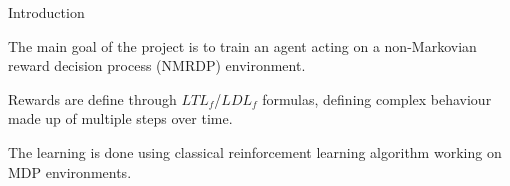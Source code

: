 \begin{frame}{Introduction}
	\begin{block}{}
    The main goal of the project is to train an agent acting on a non-Markovian reward decision process (NMRDP) environment.
	\end{block}

    \begin{block}{}
    Rewards are define through $LTL_f$/$LDL_f$ formulas, defining complex behaviour made up of multiple steps over time.
    \end{block}
    
    \begin{block}{}
    The learning is done using classical reinforcement learning algorithm working on MDP environments.
    \end{block}
\end{frame}

